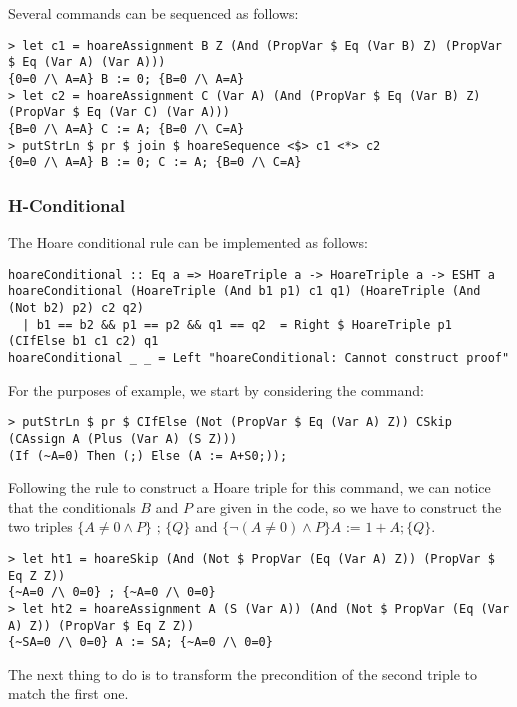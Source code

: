 \documentclass{article}
\begin{document}
Several commands can be sequenced as follows:

\begin{lstlisting}
> let c1 = hoareAssignment B Z (And (PropVar $ Eq (Var B) Z) (PropVar $ Eq (Var A) (Var A)))
{0=0 /\ A=A} B := 0; {B=0 /\ A=A}
> let c2 = hoareAssignment C (Var A) (And (PropVar $ Eq (Var B) Z) (PropVar $ Eq (Var C) (Var A)))
{B=0 /\ A=A} C := A; {B=0 /\ C=A}
> putStrLn $ pr $ join $ hoareSequence <$> c1 <*> c2
{0=0 /\ A=A} B := 0; C := A; {B=0 /\ C=A}
\end{lstlisting}

\subsubsection{H-Conditional}

The Hoare conditional rule can be implemented as follows:

\begin{lstlisting}
hoareConditional :: Eq a => HoareTriple a -> HoareTriple a -> ESHT a
hoareConditional (HoareTriple (And b1 p1) c1 q1) (HoareTriple (And (Not b2) p2) c2 q2)
  | b1 == b2 && p1 == p2 && q1 == q2  = Right $ HoareTriple p1 (CIfElse b1 c1 c2) q1
hoareConditional _ _ = Left "hoareConditional: Cannot construct proof"
\end{lstlisting}

For the purposes of example, we start by considering the command:

\begin{lstlisting}
> putStrLn $ pr $ CIfElse (Not (PropVar $ Eq (Var A) Z)) CSkip (CAssign A (Plus (Var A) (S Z)))
(If (~A=0) Then (;) Else (A := A+S0;));
\end{lstlisting}

Following the rule to construct a Hoare triple for this command, we can notice that the conditionals $B$ and $P$ are given in the code, so we have to construct the two triples $\{A \neq 0 \land P\} \texttt{ ; } \{Q\}$ and $\{\neg(A \neq 0) \land P\} A \texttt{ := } 1 + A; \{Q\}$.

\begin{lstlisting}
> let ht1 = hoareSkip (And (Not $ PropVar (Eq (Var A) Z)) (PropVar $ Eq Z Z))
{~A=0 /\ 0=0} ; {~A=0 /\ 0=0}
> let ht2 = hoareAssignment A (S (Var A)) (And (Not $ PropVar (Eq (Var A) Z)) (PropVar $ Eq Z Z))
{~SA=0 /\ 0=0} A := SA; {~A=0 /\ 0=0}
\end{lstlisting}

The next thing to do is to transform the precondition of the second triple to match the first one.
\end{document}
